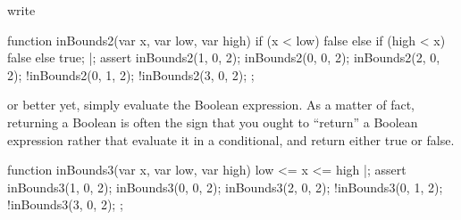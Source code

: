 \noindent
write

\begin{urbiscript}
function inBounds2(var x, var low, var high)
{
  if (x < low)
    false
  else if (high < x)
    false
  else
    true;
}|;
assert
{
  inBounds2(1, 0, 2);    inBounds2(0, 0, 2);  inBounds2(2, 0, 2);
  !inBounds2(0, 1, 2);  !inBounds2(3, 0, 2);
};
\end{urbiscript}

\noindent
or better yet, simply evaluate the Boolean expression.  As a matter of fact,
returning a Boolean is often the sign that you ought to ``return'' a Boolean
expression rather that evaluate it in a conditional, and return either true
or false.

\begin{urbiscript}
function inBounds3(var x, var low, var high)
{
  low <= x <= high
}|;
assert
{
  inBounds3(1, 0, 2);    inBounds3(0, 0, 2);  inBounds3(2, 0, 2);
  !inBounds3(0, 1, 2);  !inBounds3(3, 0, 2);
};
\end{urbiscript}


